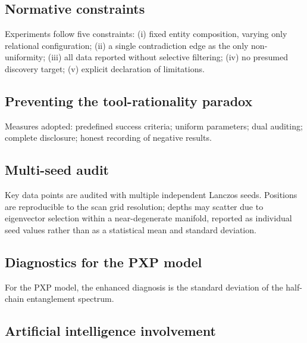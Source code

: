 \documentclass[pdflatex,sn-mathphys-num,iicol]{sn-jnl}
\begin{document}
\subsection{Normative constraints}

Experiments follow five constraints: (i) fixed entity composition, varying only relational configuration; (ii) a single contradiction edge as the only non-uniformity; (iii) all data reported without selective filtering; (iv) no presumed discovery target; (v) explicit declaration of limitations.

\subsection{Preventing the tool-rationality paradox}

Measures adopted: predefined success criteria; uniform parameters; dual auditing; complete disclosure; honest recording of negative results.

\subsection{Multi-seed audit}

Key data points are audited with multiple independent Lanczos seeds. Positions are reproducible to the scan grid resolution; depths may scatter due to eigenvector selection within a near-degenerate manifold, reported as individual seed values rather than as a statistical mean and standard deviation.

\subsection{Diagnostics for the PXP model}

For the PXP model, the enhanced diagnosis is the standard deviation of the half-chain entanglement spectrum.

\subsection{Artificial intelligence involvement}
\label{sec:ai_involvement}
\end{document}
